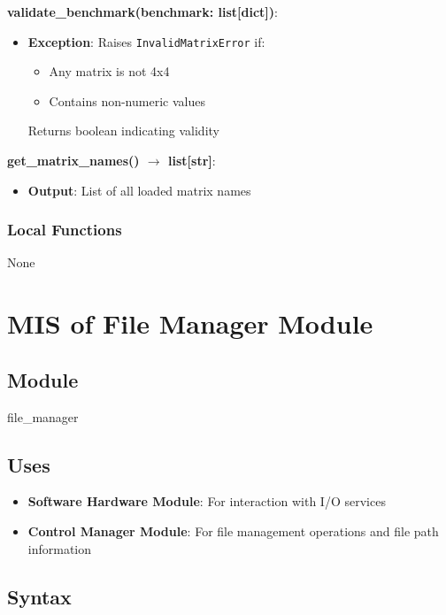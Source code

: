 \documentclass[12pt, titlepage]{article}
\begin{document}
\noindent \textbf{validate\_benchmark(benchmark: list[dict])}:
\begin{itemize}
    \item \textbf{Exception}: Raises \texttt{InvalidMatrixError} if:
    \begin{itemize}
        \item Any matrix is not 4x4
        \item Contains non-numeric values
    \end{itemize}
    Returns boolean indicating validity
\end{itemize}

\noindent \textbf{get\_matrix\_names() $\rightarrow$ list[str]}:
\begin{itemize}
    \item \textbf{Output}: List of all loaded matrix names
\end{itemize}

\subsubsection{Local Functions}

None

\newpage

\section{MIS of File Manager Module} \label{mSFM}

\subsection{Module}


file\_manager


\subsection{Uses}

\begin{itemize}
    \item \textbf{Software Hardware Module}: For interaction with I/O services
    \item \textbf{Control Manager Module}: For file management operations and file path information
\end{itemize}

\subsection{Syntax}
\end{document}
